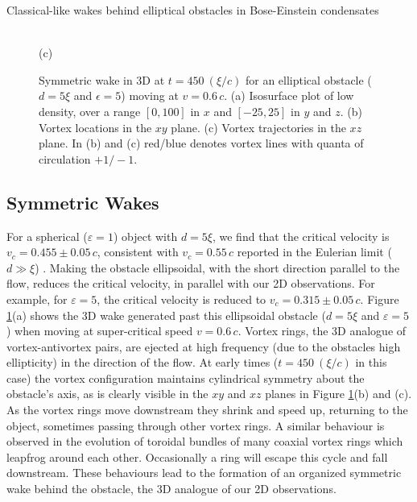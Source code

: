 \begin{chapter}{\label{cha:wake}Classical-like wakes behind elliptical obstacles in Bose-Einstein condensates}
\begin{figure}[!ht]
\begin{minipage}{0.5\linewidth}
\begin{tikzpicture}[domain=-60:100]
\end{tikzpicture}\\%
(c)\\%
%
\end{minipage}%
\caption{\label{fig:3d1} Symmetric wake in 3D at $t=450~(\xi/c)$ for an elliptical obstacle ($d=5\xi$ and $\epsilon=5$) moving at $v=0.6\,c$.  (a) Isosurface plot of low density, over a range $[0,100]$ in $x$ and $[-25,25]$ in $y$ and $z$. (b) Vortex locations in the $xy$ plane.  (c) Vortex trajectories in the $xz$ plane.  In (b) and (c) red/blue denotes vortex lines with quanta of circulation $+1/-1$.}
\end{figure}

\subsection{Symmetric Wakes} 
For a spherical ($\varepsilon=1$) object with $d=5\xi$, we find that the critical velocity is $v_c=0.455\pm 0.05\,c$, consistent with $v_c=0.55\,c$ reported in the Eulerian limit ($d \gg \xi$) \cite{win01,winiecki99}.  Making the obstacle ellipsoidal, with the short direction parallel to the flow, reduces the critical velocity, in parallel with our 2D observations.  For example, for $\varepsilon=5$, the critical velocity is reduced to $v_c=0.315 \pm 0.05\,c$.  Figure \ref{fig:3d1}(a) shows the 3D wake generated past this ellipsoidal obstacle ($d=5\xi$ and $\varepsilon = 5$) when moving at super-critical speed $v=0.6\,c$.  Vortex rings, the 3D analogue of vortex-antivortex pairs, are ejected at high frequency (due to the obstacles high ellipticity) in the direction of the flow.  At early times ($t=450~(\xi/c)$ in this case) the vortex configuration maintains cylindrical symmetry about the obstacle's axis, as is clearly visible in the $xy$ and $xz$ planes in Figure \ref{fig:3d1}(b) and (c).  As the vortex rings move downstream they shrink and speed up, returning to the object, sometimes passing through other vortex rings. A similar behaviour is observed \cite{wacks} in the evolution of toroidal bundles of many coaxial vortex rings which leapfrog around each other.  Occasionally a ring will escape this cycle and fall downstream.  These behaviours lead to the formation of an organized symmetric wake behind the obstacle,  the 3D analogue of our 2D observations.  



\end{chapter}
